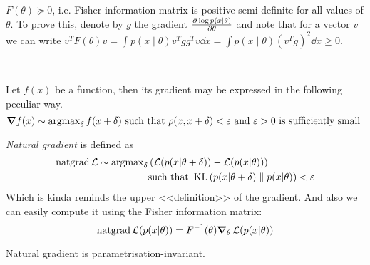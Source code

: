 \begin{eremark}
    $F(\theta) \succeq 0$, i.e. Fisher information matrix is positive semi-definite for all values of $\theta$.
    To prove this, denote by $g$ the gradient $\pdv{\log p(x\mid \theta)}{\theta}$ and note that for a vector $v$ we can write $v^T F(\theta) v = \int p(x\mid \theta) v^T gg^T v\dd x = \int p(x\mid \theta) (v^T g)^2 \dd x \ge 0$.
\end{eremark} \ 

Let $f(x)$ be a function, then its gradient may be expressed in the following peculiar way.
\[ 
    \grad f(x) \sim \operatorname{argmax}_{\delta} f(x + \delta)
    \text{ such that } \rho(x, x+ \delta) < \varepsilon \text{ and } \varepsilon>0 \text{ is sufficiently small }
\]

\begin{edefn}
    \textit{Natural gradient} is defined as
    \begin{equation*}
        \begin{aligned}
            \operatorname{natgrad} \operatorname{\mathcal{L}} \sim \operatorname{argmax}_{\delta} &\left( \operatorname{\mathcal{L}}(p (x \vert \theta + \delta) ) - \operatorname{\mathcal{L}}(p (x \vert \theta) ) \right) \\ 
            &\text{such that } \operatorname{KL} \left( p (x \vert \theta + \delta) \parallel p (x \vert \theta) \right) < \varepsilon
        \end{aligned}
    \end{equation*}
    Which is kinda reminds the upper <<definition>> of the gradient. And also we can easily compute it using the Fisher information matrix:
    \[ 
        \operatorname{natgrad} \operatorname{\mathcal{L}}(p(x \vert \theta)) = F^{-1}(\theta) \grad_\theta \operatorname{\mathcal{L}}(p(x \vert \theta))
    \]
\end{edefn}

\begin{eremark}
    Natural gradient is parametrisation-invariant.
\end{eremark}

